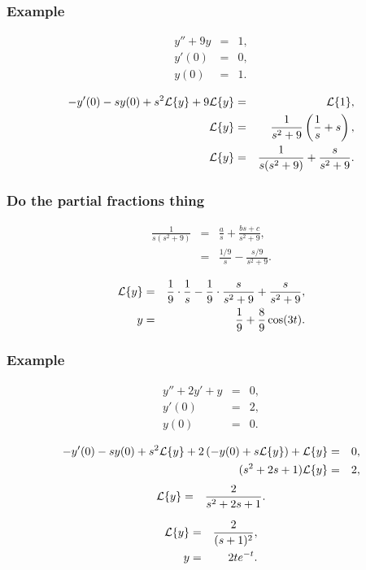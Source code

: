 \begin{frame}
  \frametitle{Example}

  \begin{eqnarray*}
    y''  + 9y & = & 1, \\
    y'(0) & = & 0, \\
    y(0) & = & 1.
  \end{eqnarray*}

  {
    \begin{eqnarray*}
      -y'(0) - s y(0) + s^2 \laplace{y} + 9 \laplace{y} & = & \laplace{1}, \\
      \laplace{y} & = & \frac{1}{s^2+9} \lp \frac{1}{s} + s \rp, \\
      \laplace{y} & = & \frac{1}{s(s^2+9)} + \frac{s}{s^2+9}.
    \end{eqnarray*}
  }


\end{frame}


\begin{frame}
  \frametitle{Do the partial fractions thing}

  \begin{eqnarray*}
    \frac{1}{s(s^2+9)} & = & \frac{a}{s} + \frac{bs+c}{s^2+9}, \\
    & = & \frac{1/9}{s} - \frac{s/9}{s^2+9}.
  \end{eqnarray*}

  {
    \begin{eqnarray*}
      \laplace{y} & = & \frac{1}{9}\cdot\frac{1}{s} - \frac{1}{9}\cdot\frac{s}{s^2+9}+\frac{s}{s^2+9}, \\
      y & = & \frac{1}{9} + \frac{8}{9}\cos(3t).
    \end{eqnarray*}
  }

\end{frame}



\begin{frame}
  \frametitle{Example}

  \begin{eqnarray*}
    y''  + 2y' + y & = & 0, \\
    y'(0) & = & 2, \\
    y(0) & = & 0.
  \end{eqnarray*}

  {
    \begin{eqnarray*}
      -y'(0) - s y(0) + s^2 \laplace{y} + 2 \lp -y(0) + s\laplace{y} \rp + \laplace{y} & = & 0, \\
      (s^2+2s+1) \laplace{y} & = & 2,
    \end{eqnarray*}
    \begin{eqnarray*}
      \laplace{y} & = & \frac{2}{s^2+2s+1}.
    \end{eqnarray*}
  }

  {
    \begin{eqnarray*}
      \laplace{y} & = & \frac{2}{(s+1)^2}, \\
      y & = & 2 t e^{-t}.
    \end{eqnarray*}
  }

\end{frame}




